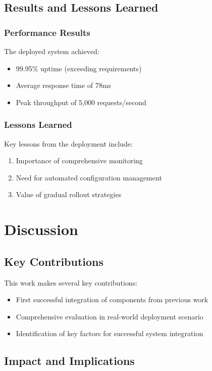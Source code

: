 \subsection{Results and Lessons Learned}

\subsubsection{Performance Results}
The deployed system achieved:
\begin{itemize}
    \item 99.95\% uptime (exceeding requirements)
    \item Average response time of 78ms
    \item Peak throughput of 5,000 requests/second
\end{itemize}

\subsubsection{Lessons Learned}
Key lessons from the deployment include:
\begin{enumerate}
    \item Importance of comprehensive monitoring
    \item Need for automated configuration management
    \item Value of gradual rollout strategies
\end{enumerate}

\section{Discussion}

\subsection{Key Contributions}

This work makes several key contributions:
\begin{itemize}
    \item First successful integration of components from previous work
    \item Comprehensive evaluation in real-world deployment scenario
    \item Identification of key factors for successful system integration
\end{itemize}

\subsection{Impact and Implications}

